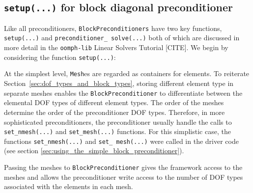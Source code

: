 \subsection{\texttt{setup(...)} for block diagonal preconditioner\label{sec:block_diagonal_preconditioner_setup}}

Like all preconditioners, \texttt{Block\allowbreak Preconditioners} have two
key functions, \texttt{setup(...)} and \texttt{preconditioner\_\allowbreak
  solve(...)} both of which are discussed in more detail in the
\texttt{oomph-\allowbreak lib} Linear Solvers Tutorial [CITE]. We begin by
considering the function \texttt{setup(...)}:
 
At the simplest level, \texttt{Mesh}es are regarded as containers for elements. To
reiterate Section~\ref{sec:dof_types_and_block_types}, storing different
element type in separate meshes enables the \texttt{BlockPreconditioner} to
differentiate between the elemental DOF types of different element types. The
order of the meshes determine the order of the preconditioner DOF types.
Therefore, in more sophisticated preconditioners, the preconditioner usually
handle the calls to \texttt{set\_\allowbreak nmesh(...)} and
\texttt{set\_\allowbreak mesh(...)} functions.  For this simplistic case, the
functions \texttt{set\_\allowbreak nmesh(...)} and \texttt{set\_\allowbreak
  mesh(...)} were called in the driver code (see section
\ref{sec:using_the_simple_block_preconditioner}).

Passing the meshes to \texttt{Block\allowbreak Preconditioner} gives the
framework access to the meshes and allows the preconditioner write access to
the number of DOF types associated with the elements in each mesh.


